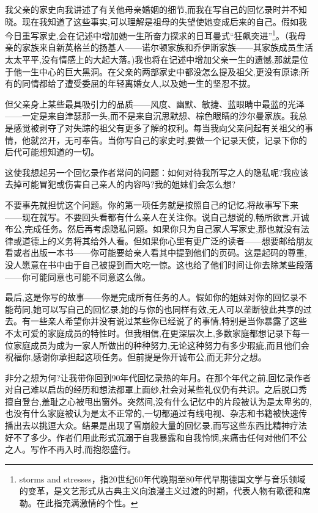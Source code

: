 我父亲的家史向我讲述了有关他母亲婚姻的细节,而我在写自己的回忆录时并不知晓。现在我知道了这些事实,可以理解是祖母的失望使她变成后来的自己。假如我今日重写家史,会在记述中增加她一生所奋力探求的日耳曼式“狂飙突进”\footnote{storms and stresses，指20世纪60年代晚期至80年代早期德国文学与音乐领域的变革，是文艺形式从古典主义向浪漫主义过渡的时期，代表人物有歌德和席勒。在此指充满激情的个性。}。（我母亲的家族来自新英格兰的扬基人——诺尔顿家族和乔伊斯家族——其家族成员生活太太平平,没有情感上的大起大落。)我也将在记述中增加父亲一生的遗憾,那就是位于他一生中心的巨大黑洞。在父亲的两部家史中都没怎么提及祖父,更没有原谅;所有的同情都给了遭受委屈的年轻离婚女人,以及她一生的坚忍不拔。

但父亲身上某些最具吸引力的品质——风度、幽默、敏捷、蓝眼睛中最蓝的光泽——一定是来自津瑟那一头,而不是来自沉思默想、棕色眼睛的沙尔曼家族。我总是感觉被剥夺了对失踪的祖父有更多了解的权利。每当我向父亲问起有关祖父的事情，他就岔开，无可奉告。当你写自己的家史时,要做一个记录天使，记录下你的后代可能想知道的一切。

这使我想起另一个回忆录作者常问的问题：如何对待我所写之人的隐私呢?我应该去掉可能冒犯或伤害自己亲人的内容吗?我的姐妹们会怎么想?

不要事先就担忧这个问题。你的第一项任务就是按照自己的记忆,将故事写下来——现在就写。不要回头看都有什么亲人在关注你。说自己想说的,畅所欲言,开诚布公,完成任务。然后再考虑隐私问题。如果你只为自己家人写家史,那也就没有法律或道德上的义务将其给外人看。但如果你心里有更广泛的读者——想要邮给朋友看或者出版一本书——你可能要给亲人看其中提到他们的页码。这是起码的尊重,没人愿意在书中由于自己被提到而大吃一惊。这也给了他们时间让你去除某些段落——你可能同意也可能不同意这么做。

最后,这是你写的故事——你是完成所有任务的人。假如你的姐妹对你的回忆录不能苟同,她可以写自己的回忆录,她的与你的也同样有效,无人可以垄断彼此共享的过去。有一些亲人希望你并没有说过某些你已经说了的事情,特别是当你暴露了这些不太可爱的家庭成员的特性时。但我相信,在更深层次上,多数家庭都想记录下每一位家庭成员为成为一家人所做出的种种努力,无论这种努力有多少瑕疵,而且他们会祝福你,感谢你承担起这项任务。但前提是你开诚布公,而无非分之想。

非分之想为何?让我带你回到90年代回忆录热的年月。在那个年代之前,回忆录作者对自己难以启齿的经历和想法都罩上面纱,社会对某些礼仪仍有共识。之后脱口秀擅自登台,羞耻之心被甩出窗外。突然间,没有什么记忆中的片段被认为是太卑劣的,也没有什么家庭被认为是太不正常的,一切都通过有线电视、杂志和书籍被快速传播出去以挑逗大众。结果是出现了雪崩般大量的回忆录,而写这些东西比精神疗法好不了多少。作者们用此形式沉溺于自我暴露和自我怜悯,来痛击任何对他们不公之人。写作不再入时,而抱怨盛行。

